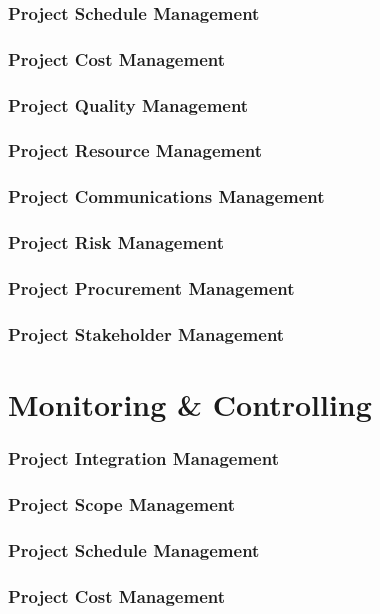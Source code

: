 \documentclass[12pt,letterpaper]{report}
\begin{document}
	\section{Project Schedule Management}
	\section{Project Cost Management}
	\section{Project Quality Management}
	\section{Project Resource Management}
	\section{Project Communications Management}
	\section{Project Risk Management}
	\section{Project Procurement Management}
	\section{Project Stakeholder Management}
	
	
	\part{Monitoring \& Controlling}
	\section{Project Integration Management}
	\section{Project Scope Management}
	\section{Project Schedule Management}
	\section{Project Cost Management}
\end{document}
